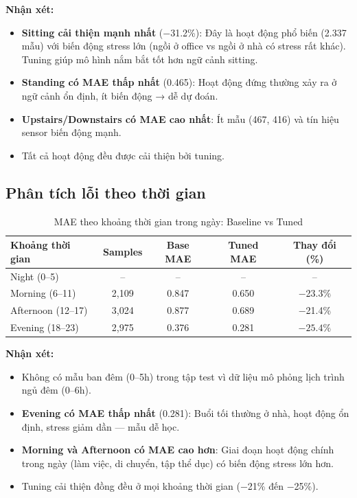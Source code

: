 \textbf{Nhận xét:}
\begin{itemize}
    \item \textbf{Sitting cải thiện mạnh nhất} ($-$31.2\%): Đây là hoạt động phổ biến (2.337 mẫu) với biến động stress lớn (ngồi ở office vs ngồi ở nhà có stress rất khác). Tuning giúp mô hình nắm bắt tốt hơn ngữ cảnh sitting.
    \item \textbf{Standing có MAE thấp nhất} (0.465): Hoạt động đứng thường xảy ra ở ngữ cảnh ổn định, ít biến động → dễ dự đoán.
    \item \textbf{Upstairs/Downstairs có MAE cao nhất}: Ít mẫu (467, 416) và tín hiệu sensor biến động mạnh.
    \item Tất cả hoạt động đều được cải thiện bởi tuning.
\end{itemize}

\subsection{Phân tích lỗi theo thời gian}
\label{subsec:error_by_time}

\begin{table}[H]
\centering
\caption{MAE theo khoảng thời gian trong ngày: Baseline vs Tuned}
\label{tab:error_by_time}
\small
\begin{tabular}{|l|c|c|c|c|}
\hline
\textbf{Khoảng thời gian} & \textbf{Samples} & \textbf{Base MAE} & \textbf{Tuned MAE} & \textbf{Thay đổi (\%)} \\
\hline
Night (0--5)       & --      & --    & --    & -- \\
Morning (6--11)    & 2{,}109 & 0.847 & 0.650 & $-$23.3\% \\
Afternoon (12--17) & 3{,}024 & 0.877 & 0.689 & $-$21.4\% \\
Evening (18--23)   & 2{,}975 & 0.376 & 0.281 & $\mathbf{-25.4\%}$ \\
\hline
\end{tabular}
\end{table}

\textbf{Nhận xét:}
\begin{itemize}
    \item Không có mẫu ban đêm (0--5h) trong tập test vì dữ liệu mô phỏng lịch trình ngủ đêm (0--6h).
    \item \textbf{Evening có MAE thấp nhất} (0.281): Buổi tối thường ở nhà, hoạt động ổn định, stress giảm dần — mẫu dễ học.
    \item \textbf{Morning và Afternoon có MAE cao hơn}: Giai đoạn hoạt động chính trong ngày (làm việc, di chuyển, tập thể dục) có biến động stress lớn hơn.
    \item Tuning cải thiện đồng đều ở mọi khoảng thời gian ($-$21\% đến $-$25\%).
\end{itemize}

